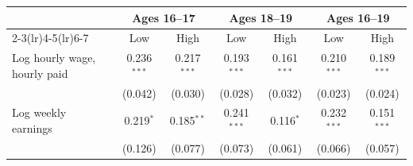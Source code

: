 \begin{tabular}{lcccccc}
\toprule
 & \multicolumn{2}{c}{Ages 16--17} & \multicolumn{2}{c}{Ages 18--19} & \multicolumn{2}{c}{Ages 16--19} \\
\cmidrule(lr){2-3}\cmidrule(lr){4-5}\cmidrule(lr){6-7}
 & Low & High & Low & High & Low & High \\
\midrule
Log hourly wage, hourly paid & 0.236$^{***}$ & 0.217$^{***}$ & 0.193$^{***}$ & 0.161$^{***}$ & 0.210$^{***}$ & 0.189$^{***}$ \\
 & (0.042) & (0.030) & (0.028) & (0.032) & (0.023) & (0.024) \\
Log weekly earnings & 0.219$^{*}$ & 0.185$^{**}$ & 0.241$^{***}$ & 0.116$^{*}$ & 0.232$^{***}$ & 0.151$^{***}$ \\
 & (0.126) & (0.077) & (0.073) & (0.061) & (0.066) & (0.057) \\
\bottomrule
\end{tabular}
